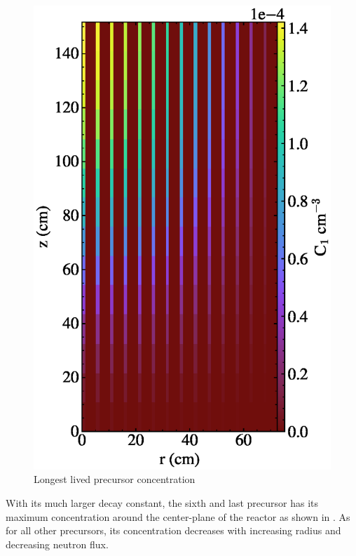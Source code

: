 \documentclass{article}
\begin{document}
\begin{figure}
  \centering
  \includegraphics{auto_diff_rho_pre1.eps}
  \caption{Longest lived precursor concentration}
  \label{fig:pre1}
\end{figure}

With its much larger decay constant, the sixth and last precursor has its
maximum concentration around the center-plane of the reactor as shown in
. As for all other precursors, its concentration decreases with
increasing radius and decreasing neutron flux.
\end{document}
